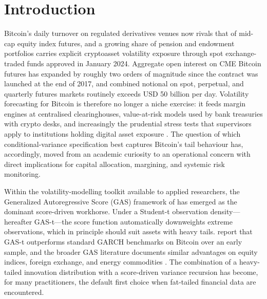 
\section{Introduction}
\label{sec:intro}

Bitcoin's daily turnover on regulated derivatives venues now rivals that of mid-cap equity index futures, and a growing share of pension and endowment portfolios carries explicit cryptoasset volatility exposure through spot exchange-traded funds approved in January 2024. Aggregate open interest on CME Bitcoin futures has expanded by roughly two orders of magnitude since the contract was launched at the end of 2017, and combined notional on spot, perpetual, and quarterly futures markets routinely exceeds USD 50 billion per day. Volatility forecasting for Bitcoin is therefore no longer a niche exercise: it feeds margin engines at centralised clearinghouses, value-at-risk models used by bank treasuries with crypto desks, and increasingly the prudential stress tests that supervisors apply to institutions holding digital asset exposure \citep{liu2021}. The question of which conditional-variance specification best captures Bitcoin's tail behaviour has, accordingly, moved from an academic curiosity to an operational concern with direct implications for capital allocation, margining, and systemic risk monitoring.

Within the volatility-modelling toolkit available to applied researchers, the Generalized Autoregressive Score (GAS) framework of \citet{creal2013} has emerged as the dominant score-driven workhorse. Under a Student-t observation density---hereafter GAS-t---the score function automatically downweights extreme observations, which in principle should suit assets with heavy tails. \citet{catania2017} report that GAS-t outperforms standard GARCH benchmarks on Bitcoin over an early sample, and the broader GAS literature documents similar advantages on equity indices, foreign exchange, and energy commodities \citep{harvey2013,lucas2016,catania2019}. The combination of a heavy-tailed innovation distribution with a score-driven variance recursion has become, for many practitioners, the default first choice when fat-tailed financial data are encountered.

